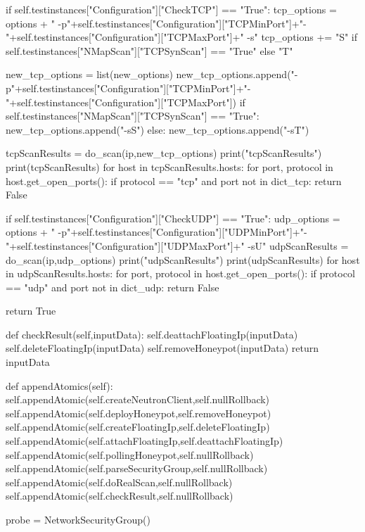 \begin{python}
		if self.testinstances["Configuration"]["CheckTCP"] == "True":
			tcp_options = options + " -p"+self.testinstances["Configuration"]["TCPMinPort"]+"-"+self.testinstances["Configuration"]["TCPMaxPort"]+" -s"
			tcp_options += "S" if self.testinstances["NMapScan"]["TCPSynScan"] == "True" else "T"
			
			new_tcp_options = list(new_options)
			new_tcp_options.append("-p"+self.testinstances["Configuration"]["TCPMinPort"]+"-"+self.testinstances["Configuration"]["TCPMaxPort"])
			if self.testinstances["NMapScan"]["TCPSynScan"] == "True":
				new_tcp_options.append("-sS")
			else:
				new_tcp_options.append("-sT")

			tcpScanResults = do_scan(ip,new_tcp_options)
			print("tcpScanResults")
			print(tcpScanResults)
			for host in tcpScanResults.hosts:
				for port, protocol in host.get_open_ports():
					if protocol == "tcp" and port not in dict_tcp:
						return False


		if self.testinstances["Configuration"]["CheckUDP"] == "True":
			udp_options = options + " -p"+self.testinstances["Configuration"]["UDPMinPort"]+"-"+self.testinstances["Configuration"]["UDPMaxPort"]+" -sU"	
			udpScanResults = do_scan(ip,udp_options)
			print("udpScanResults")
			print(udpScanResults)
			for host in udpScanResults.hosts:
				for port, protocol in host.get_open_ports():
					if protocol == "udp" and port not in dict_udp:
						return False

		return True


	def checkResult(self,inputData):
		self.deattachFloatingIp(inputData)
		self.deleteFloatingIp(inputData)
		self.removeHoneypot(inputData)
		return inputData

	def appendAtomics(self):
		self.appendAtomic(self.createNeutronClient,self.nullRollback)
		self.appendAtomic(self.deployHoneypot,self.removeHoneypot)
		self.appendAtomic(self.createFloatingIp,self.deleteFloatingIp)
		self.appendAtomic(self.attachFloatingIp,self.deattachFloatingIp)
		self.appendAtomic(self.pollingHoneypot,self.nullRollback)
		self.appendAtomic(self.parseSecurityGroup,self.nullRollback)
		self.appendAtomic(self.doRealScan,self.nullRollback)
		self.appendAtomic(self.checkResult,self.nullRollback)

probe = NetworkSecurityGroup()
\end{python}
\label{app:isolamento}
